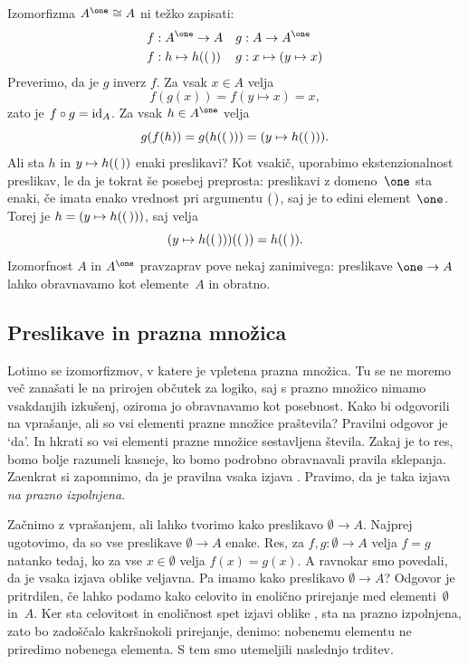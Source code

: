 Izomorfizma $A^{\one} \cong A$ ni težko zapisati:
%
\begin{align*}
  f &: A^{\one} \to A &
  g &: A \to A^{\one} \\
  f &: h \mapsto h(\unit) &
  g &: x \mapsto (y \mapsto x)
\end{align*}
%
Preverimo, da je $g$ inverz $f$. Za vsak $x \in A$ velja
%
\begin{equation*}
  f(g(x)) = f(y \mapsto x) = x,
\end{equation*}
%
zato je $f \circ g = \id[A]$. Za vsak $h \in A^{\one}$ velja
%
\begin{equation*}
  g(f(h)) = g(h(\unit)) = (y \mapsto h(\unit)).
\end{equation*}
%
Ali sta $h$ in $y \mapsto h(\unit)$ enaki preslikavi? Kot vsakič, uporabimo
ekstenzionalnost preslikav, le da je tokrat še posebej preprosta: preslikavi z
domeno~$\one$ sta enaki, če imata enako vrednost pri argumentu $\unit$, saj je to edini
element~$\one$. Torej je $h = (y \mapsto h(\unit))$, saj velja
%
\begin{equation*}
  (y \mapsto h(\unit))(\unit) = h(\unit).
\end{equation*}
%
Izomorfnost $A$ in $A^{\one}$ pravzaprav pove nekaj zanimivega: preslikave $\one \to A$
lahko obravnavamo kot elemente~$A$ in obratno.

\subsection{Preslikave in prazna množica}
\label{sec:presl-prazna-mnozica}

Lotimo se izomorfizmov, v katere je vpletena prazna množica. Tu se ne moremo več zanašati
le na prirojen občutek za logiko, saj s prazno množico nimamo vsakdanjih izkušenj, oziroma
jo obravnavamo kot posebnost. Kako bi odgovorili na vprašanje, ali so vsi elementi prazne
množice praštevila? Pravilni odgovor je `da'. In hkrati so vsi elementi prazne množice
sestavljena števila. Zakaj je to res, bomo bolje razumeli
kasneje, ko bomo podrobno obravnavali pravila sklepanja.
Zaenkrat si zapomnimo, da je pravilna vsaka izjava . Pravimo, da je taka izjava \emph{na prazno izpolnjena}.

Začnimo z vprašanjem, ali lahko tvorimo kako preslikavo $\emptyset \to A$. Najprej
ugotovimo, da so vse preslikave $\emptyset \to A$ enake. Res, za $f, g : \emptyset \to A$
velja $f = g$ natanko tedaj, ko za vse $x \in \emptyset$ velja $f(x) = g(x)$. A ravnokar
smo povedali, da je vsaka izjava oblike  veljavna. Pa
imamo kako preslikavo $\emptyset \to A$? Odgovor je pritrdilen, če lahko podamo kako
celovito in enolično prirejanje med elementi~$\emptyset$ in~$A$. Ker sta celovitost in
enoličnost spet izjavi oblike , sta na prazno izpolnjena,
zato bo zadoščalo kakršnokoli prirejanje, denimo: nobenemu elementu ne priredimo nobenega
elementa. S tem smo utemeljili naslednjo trditev.

